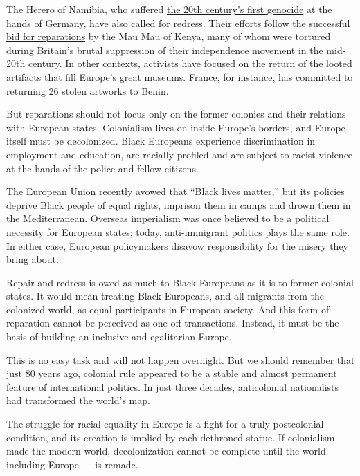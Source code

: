 The Herero of Namibia, who suffered
\href{https://www.ushmm.org/collections/bibliography/herero-and-nama-genocide}{the
20th century's first genocide} at the hands of Germany, have also called
for redress. Their efforts follow the
\href{https://www.bbc.co.uk/news/uk-22790037}{successful bid for
reparations} by the Mau Mau of Kenya, many of whom were tortured during
Britain's brutal suppression of their independence movement in the
mid-20th century. In other contexts, activists have focused on the
return of the looted artifacts that fill Europe's great museums. France,
for instance, has committed to returning 26 stolen artworks to Benin.

But reparations should not focus only on the former colonies and their
relations with European states. Colonialism lives on inside Europe's
borders, and Europe itself must be decolonized. Black Europeans
experience discrimination in employment and education, are racially
profiled and are subject to racist violence at the hands of the police
and fellow citizens.

The European Union recently avowed that ``Black lives matter,'' but its
policies deprive Black people of equal rights,
\href{https://www.nytimes3xbfgragh.onion/2018/10/03/opinion/greece-europe-refugees.html}{imprison
them in camps} and
\href{https://www.nytimes3xbfgragh.onion/interactive/2018/12/26/opinion/europe-migrant-crisis-mediterranean-libya.html}{drown
them in the Mediterranean}. Overseas imperialism was once believed to be
a political necessity for European states; today, anti-immigrant
politics plays the same role. In either case, European policymakers
disavow responsibility for the misery they bring about.

Repair and redress is owed as much to Black Europeans as it is to former
colonial states. It would mean treating Black Europeans, and all
migrants from the colonized world, as equal participants in European
society. And this form of reparation cannot be perceived as one-off
transactions. Instead, it must be the basis of building an inclusive and
egalitarian Europe.

This is no easy task and will not happen overnight. But we should
remember that just 80 years ago, colonial rule appeared to be a stable
and almost permanent feature of international politics. In just three
decades, anticolonial nationalists had transformed the world's map.

The struggle for racial equality in Europe is a fight for a truly
postcolonial condition, and its creation is implied by each dethroned
statue. If colonialism made the modern world, decolonization cannot be
complete until the world --- including Europe --- is remade.

